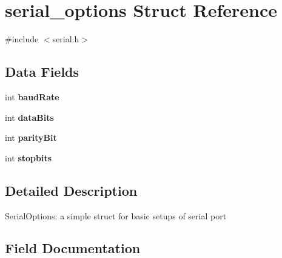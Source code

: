 \section{serial\+\_\+options Struct Reference}
\label{structserial__options}


{\ttfamily \#include $<$serial.\+h$>$}

\subsection*{Data Fields}
\begin{DoxyCompactItemize}
\item 
int {\bf baud\+Rate}
\item 
int {\bf data\+Bits}
\item 
int {\bf parity\+Bit}
\item 
int {\bf stopbits}
\end{DoxyCompactItemize}


\subsection{Detailed Description}
Serial\+Options\+: a simple struct for basic setups of serial port 

\subsection{Field Documentation}
